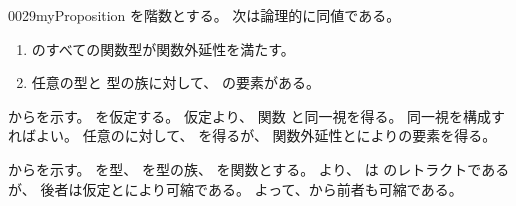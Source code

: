 \documentclass[index]{subfiles}
\begin{document}
\begin{myBlock}{0029}{myProposition}
  を階数とする。
  次は論理的に同値である。
  \begin{enumerate}
  \item \label{0029:0000} のすべての関数型が関数外延性を満たす。
  \item \label{0029:0001} 任意の型と
    型の族に対して、
    の要素がある。
  \end{enumerate}
\end{myBlock}
\begin{myProof}
  からを示す。
  を仮定する。
  仮定より、
  関数
  と同一視を得る。
  同一視を構成すればよい。
  任意のに対して、
  を得るが、
  関数外延性とによりの要素を得る。

  からを示す。
  を型、
  を型の族、
  を関数とする。
  より、
  は
  のレトラクトであるが、
  後者は仮定とにより可縮である。
  よって、から前者も可縮である。
\end{myProof}
\end{document}
